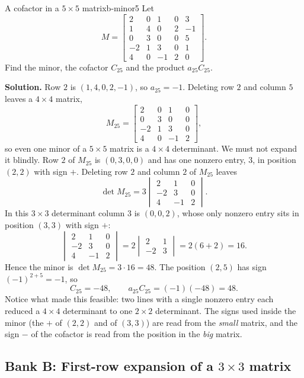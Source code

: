 \documentclass[11pt]{article}
\begin{document}
\begin{exmp}{A cofactor in a $5\times5$ matrix}{b-minor5}
Let
\[
M=\begin{bmatrix}2&0&1&0&3\\1&4&0&2&-1\\0&3&0&0&5\\-2&1&3&0&1\\4&0&-1&2&0\end{bmatrix}.
\]
Find the minor, the cofactor $C_{25}$ and the product $a_{25}C_{25}$.

\textbf{Solution.} Row $2$ is $(1,4,0,2,-1)$, so $a_{25}=-1$. Deleting row $2$ and column $5$ leaves a $4\times4$ matrix,
\[
M_{25}=\begin{bmatrix}2&0&1&0\\0&3&0&0\\-2&1&3&0\\4&0&-1&2\end{bmatrix},
\]
so even one minor of a $5\times5$ matrix is a $4\times4$ determinant. We must not expand it blindly. Row $2$ of $M_{25}$ is $(0,3,0,0)$ and has one nonzero entry, $3$, in position $(2,2)$ with sign $+$. Deleting row $2$ and column $2$ of $M_{25}$ leaves
\[
\det M_{25}=3\begin{vmatrix}2&1&0\\-2&3&0\\4&-1&2\end{vmatrix}.
\]
In this $3\times3$ determinant column $3$ is $(0,0,2)$, whose only nonzero entry sits in position $(3,3)$ with sign $+$:
\[
\begin{vmatrix}2&1&0\\-2&3&0\\4&-1&2\end{vmatrix}=2\begin{vmatrix}2&1\\-2&3\end{vmatrix}=2(6+2)=16.
\]
Hence the minor is $\det M_{25}=3\cdot16=48$. The position $(2,5)$ has sign $(-1)^{2+5}=-1$, so
\[
C_{25}=-48,\qquad a_{25}C_{25}=(-1)(-48)=48.
\]
Notice what made this feasible: two lines with a single nonzero entry each reduced a $4\times4$ determinant to one $2\times2$ determinant. The signs used inside the minor (the $+$ of $(2,2)$ and of $(3,3)$) are read from the \emph{small} matrix, and the sign $-$ of the cofactor is read from the position in the \emph{big} matrix.
\end{exmp}

\subsection*{Bank B: First-row expansion of a $3\times3$ matrix}
\end{document}
